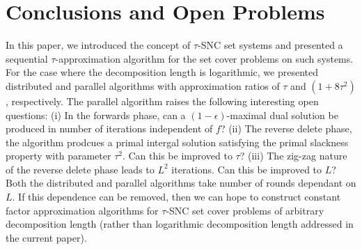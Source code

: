 \documentclass[11pt]{article}
\begin{document}
\section{Conclusions and Open Problems}
In this paper, we introduced the concept of $\tau$-SNC set systems
and presented a sequential $\tau$-approximation algorithm for the set cover problems on such systems.
For the case where the decomposition length is logarithmic, we presented distributed 
and parallel algorithms with approximation ratios of $\tau$ and $(1+8\tau^2)$, respectively.
The parallel algorithm raises the following interesting open questions:
(i) In the forwards phase, can a $(1-\epsilon)$-maximal dual solution
be produced in number of iterations independent of $f$? 
(ii) The reverse delete phase, the algorithm prodcues a primal intergal solution satisfying the primal slackness property
with parameter $\tau^2$. Can this be improved to $\tau$? (iii) The zig-zag nature of the reverse delete phase
leads to $L^2$ iterations. Can this be improved to $L$?
Both the distributed and parallel algorithms take number of rounds dependant on $L$.
If this dependence can be removed, then we can hope to construct constant factor approximation
algorithms for $\tau$-SNC set cover problems of arbitrary decomposition length (rather than logarithmic decomposition length 
addressed in the current paper). 




\end{document}

